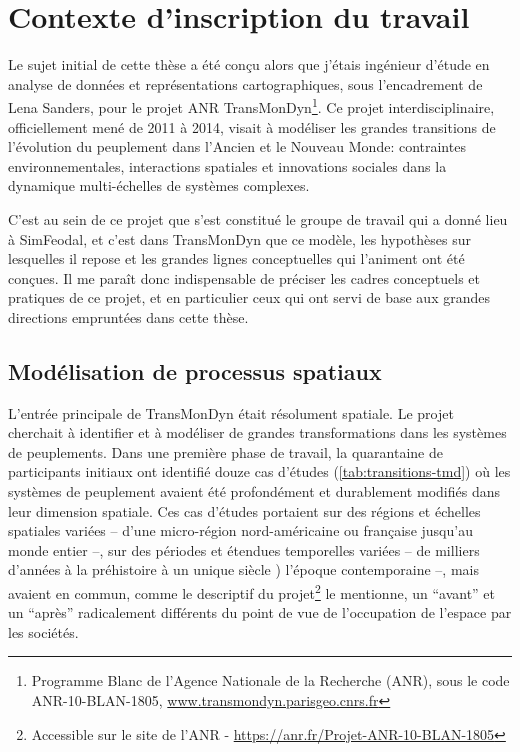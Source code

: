 \section{Contexte d'inscription du travail \label{sec:contexte}}

Le sujet initial de cette thèse a été conçu alors que j'étais ingénieur d'étude en analyse de données et représentations cartographiques, sous l'encadrement de Lena Sanders, pour le projet ANR TransMonDyn\footnote{
	Programme \og Blanc\fg{} de l'Agence Nationale de la Recherche (ANR), sous le code \mbox{ANR-10-BLAN-1805},  \href{http://www.transmondyn.parisgeo.cnrs.fr/}{www.transmondyn.parisgeo.cnrs.fr}
}.
Ce projet interdisciplinaire, officiellement mené de 2011 à 2014, visait à \og modéliser les grandes transitions de l'évolution du peuplement dans l'Ancien et le Nouveau Monde: contraintes environnementales, interactions spatiales et innovations sociales dans la dynamique multi-échelles de systèmes complexes\fg{}.

C'est au sein de ce projet que s'est constitué le groupe de travail qui a donné lieu à SimFeodal, et c'est dans TransMonDyn que ce modèle, les hypothèses sur lesquelles il repose et les grandes lignes conceptuelles qui l'animent ont été conçues.
Il me paraît donc indispensable de préciser les cadres conceptuels et pratiques de ce projet, et en particulier ceux qui ont servi de base aux grandes directions empruntées dans cette thèse.

\subsection{Modélisation de processus spatiaux}

L'entrée principale de TransMonDyn était résolument spatiale.
Le projet cherchait à identifier et à modéliser de grandes transformations dans les systèmes de peuplements.
Dans une première phase de travail, la quarantaine de participants initiaux ont identifié douze cas d'études (\cref{tab:transitions-tmd}) où les systèmes de peuplement avaient été profondément et durablement modifiés dans leur dimension spatiale.
Ces cas d'études portaient sur des régions et échelles spatiales variées -- d'une micro-région nord-américaine ou française jusqu'au monde entier --, sur des périodes et étendues temporelles variées -- de milliers d'années à la préhistoire à un unique siècle ) l'époque contemporaine --, mais avaient en commun, comme le descriptif du projet\footnote{
	Accessible sur le site de l'ANR -  \href{https://anr.fr/Projet-ANR-10-BLAN-1805}{https://anr.fr/Projet-ANR-10-BLAN-1805}
} le mentionne, \og un “avant” et un “après” radicalement différents du point de vue de l'occupation de l'espace par les sociétés\fg{}.

